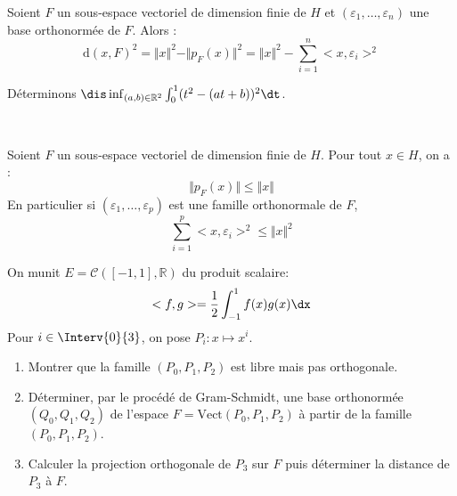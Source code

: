 \documentclass[a4paper,10pt]{report}
\begin{document}
\begin{preuve}
\vspace{7cm}
\end{preuve}

\begin{prop} Soient $F$ un sous-espace vectoriel de dimension finie de $H$ et $(\varepsilon_1, \ldots, \varepsilon_n)$ une base orthonormée de $F$. Alors :
$$ \textrm{d}(x,F)^2 = \Vert x \Vert^2 - \Vert p_F(x) \Vert^2 = \Vert x \Vert^2 - \sum_{i=1}^n <x,\varepsilon_i>^2 $$
\end{prop}

\begin{preuve}
\vspace{6cm}
\end{preuve}


\begin{ex} Déterminons $\dis \inf_{(a,b) \in \mathbb{R}^2} \int_{0}^1 (t^2-(at+b))^2 \dt$.

\vspace{11cm}
\end{ex} 

\newpage

$\phantom{test}$

\vspace{1cm}

\begin{cor}
Soient $F$ un sous-espace vectoriel de dimension finie de $H$. Pour tout $x \in H$, on a :
$$ \Vert p_F(x) \Vert \leq \Vert x \Vert$$
En particulier si $(\varepsilon_1, \ldots, \varepsilon_p)$ est une famille orthonormale de $F$,
$$ \sum_{i=1}^p <x,\varepsilon_i>^2 \leq \Vert x \Vert^2 $$
\end{cor}

\begin{preuve}
\vspace{2cm}
\end{preuve}

\begin{exa} On munit $E = \mathcal{C}([ - 1,1],\mathbb{R})$ du produit scalaire:
  \[
  <f,g> = \frac{1}{2}\int_{ - 1}^{1} f(x)g(x) \dx
  \]
Pour $i \in \Interv{0}{3}$, on pose $P_{i} : x \mapsto x^{i}$.
  \begin{enumerate}
  \item Montrer que la famille $(P_{0} ,P_{1} ,P_{2})$ est libre mais pas orthogonale.
  \item Déterminer, par le procédé de Gram-Schmidt, une base orthonormée $(Q_{0} ,Q_{1} ,Q_{2})$ de l'espace $F = \textrm{Vect}(P_{0} ,P_{1} ,P_{2})$ à partir de la famille $(P_{0} ,P_{1} ,P_{2})$.
  \item Calculer la projection orthogonale de $P_{3}$ sur $F$ puis déterminer la distance de $P_{3}$ à $F$.
  \end{enumerate}
\end{exa}
\end{document}
